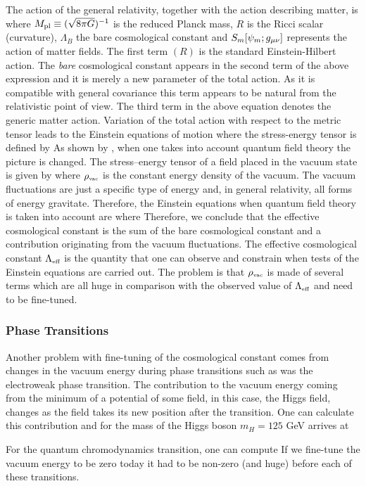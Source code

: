 The action of the general relativity, together with the action describing matter, is
where $M_{\text{\scriptsize pl}}\equiv(\sqrt{8\pi G})^{-1}$ is the reduced Planck mass, $R$ is the Ricci scalar (curvature), $\Lambda_B$ the bare cosmological constant and $S_m[\psi_m;g_{\mu\nu}]$ represents the action of matter fields. The first term $(R)$ is the standard Einstein-Hilbert action. The \textit{bare} cosmological constant appears in the second term of the above expression and it is merely a new parameter of the total action. As it is compatible with general covariance this term appears to be natural from the relativistic point of view. The third term in the above equation denotes the generic matter action. Variation of the total action with respect to the metric tensor leads to the Einstein equations of motion
where the stress-energy tensor is defined by
As shown by \textcite{1968SPhD...12.1040S}, when one takes into account quantum field theory the picture is changed. The stress--energy tensor of a field placed in the vacuum state is given by
where $\rho_\text{\tiny vac}$ is the constant energy density of the vacuum. The vacuum fluctuations are just a specific type of energy and, in general relativity, all forms of energy gravitate. Therefore, the Einstein equations when quantum field theory is taken into account are
where
Therefore, we conclude that the effective cosmological constant is the sum of the bare cosmological constant and a contribution originating from the vacuum fluctuations. The effective cosmological constant $\Lambda_\text{\tiny eff}$ is the quantity that one can observe and constrain when tests of the Einstein equations are carried out. The problem is that $\rho_\text{\tiny vac}$ is made of several terms which are all huge in comparison with the observed value of $\Lambda_\text{\tiny eff}$ and need to be fine-tuned.
\subsubsection{Phase Transitions}
\begin{sloppypar}
Another problem with fine-tuning of the cosmological constant comes from changes in the vacuum energy during phase transitions such as was the electroweak phase transition. The contribution to the vacuum energy coming from the minimum of a potential of some field, in this case, the Higgs field, changes as the field takes its new position after the transition. One can calculate this contribution \parencite{2012CRPhy..13..566M} and for the mass of the Higgs boson $m_H=125$ GeV arrives at
\end{sloppypar}
For the quantum chromodynamics transition, one can compute
If we fine-tune the vacuum energy to be zero today it had to be non-zero (and huge) before each of these transitions.
